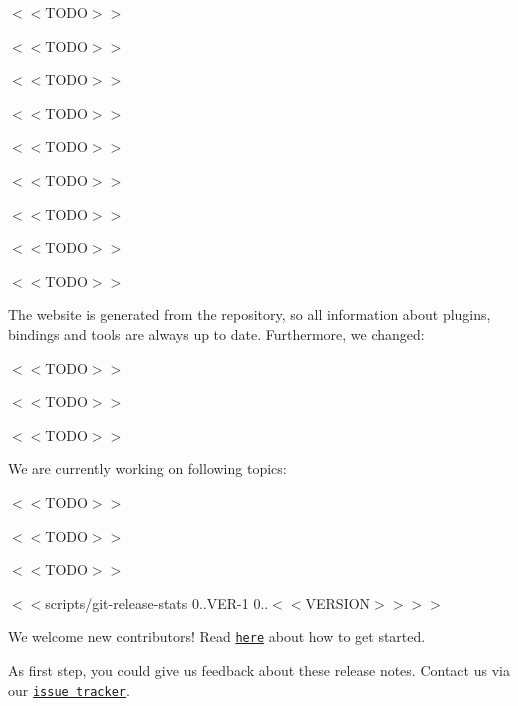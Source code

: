 \begin{DoxyItemize}
\item $<$$<$\+T\+O\+D\+O$>$$>$
\item $<$$<$\+T\+O\+D\+O$>$$>$
\item $<$$<$\+T\+O\+D\+O$>$$>$
\end{DoxyItemize}


\begin{DoxyItemize}
\item $<$$<$\+T\+O\+D\+O$>$$>$
\item $<$$<$\+T\+O\+D\+O$>$$>$
\item $<$$<$\+T\+O\+D\+O$>$$>$
\end{DoxyItemize}


\begin{DoxyItemize}
\item $<$$<$\+T\+O\+D\+O$>$$>$
\item $<$$<$\+T\+O\+D\+O$>$$>$
\item $<$$<$\+T\+O\+D\+O$>$$>$
\end{DoxyItemize}

The website is generated from the repository, so all information about plugins, bindings and tools are always up to date. Furthermore, we changed\+:


\begin{DoxyItemize}
\item $<$$<$\+T\+O\+D\+O$>$$>$
\item $<$$<$\+T\+O\+D\+O$>$$>$
\item $<$$<$\+T\+O\+D\+O$>$$>$
\end{DoxyItemize}

We are currently working on following topics\+:


\begin{DoxyItemize}
\item $<$$<$\+T\+O\+D\+O$>$$>$
\item $<$$<$\+T\+O\+D\+O$>$$>$
\item $<$$<$\+T\+O\+D\+O$>$$>$
\end{DoxyItemize}

$<$$<${\ttfamily scripts/git-\/release-\/stats 0..\+V\+ER-\/1 0..$<$$<$V\+E\+R\+S\+I\+ON$>$$>$}$>$$>$

We welcome new contributors! Read \href{https://www.libelektra.org/devgettingstarted/ideas}{\tt here} about how to get started.

As first step, you could give us feedback about these release notes. Contact us via our \href{https://issues.libelektra.org}{\tt issue tracker}.

